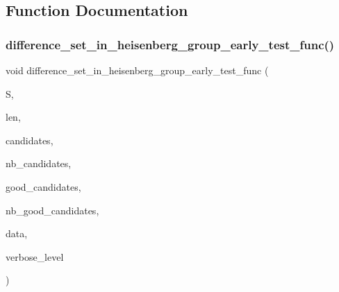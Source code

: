 \subsection{Function Documentation}
\mbox{\label{tao_8_c_a696947ce24a557d4761ee86b8b40c670}} 
\subsubsection{\texorpdfstring{difference\+\_\+set\+\_\+in\+\_\+heisenberg\+\_\+group\+\_\+early\+\_\+test\+\_\+func()}{difference\_set\_in\_heisenberg\_group\_early\_test\_func()}}
{\footnotesize\ttfamily void difference\+\_\+set\+\_\+in\+\_\+heisenberg\+\_\+group\+\_\+early\+\_\+test\+\_\+func (\begin{DoxyParamCaption}\item[{\mbox{\hyperlink{galois_8h_a09fddde158a3a20bd2dcadb609de11dc}{I\+NT}} $\ast$}]{S,  }\item[{\mbox{\hyperlink{galois_8h_a09fddde158a3a20bd2dcadb609de11dc}{I\+NT}}}]{len,  }\item[{\mbox{\hyperlink{galois_8h_a09fddde158a3a20bd2dcadb609de11dc}{I\+NT}} $\ast$}]{candidates,  }\item[{\mbox{\hyperlink{galois_8h_a09fddde158a3a20bd2dcadb609de11dc}{I\+NT}}}]{nb\+\_\+candidates,  }\item[{\mbox{\hyperlink{galois_8h_a09fddde158a3a20bd2dcadb609de11dc}{I\+NT}} $\ast$}]{good\+\_\+candidates,  }\item[{\mbox{\hyperlink{galois_8h_a09fddde158a3a20bd2dcadb609de11dc}{I\+NT}} \&}]{nb\+\_\+good\+\_\+candidates,  }\item[{void $\ast$}]{data,  }\item[{\mbox{\hyperlink{galois_8h_a09fddde158a3a20bd2dcadb609de11dc}{I\+NT}}}]{verbose\+\_\+level }\end{DoxyParamCaption})}

\mbox{\label{tao_8_c_ab251b50223d5b8ccec828c043255f2f0}} 
